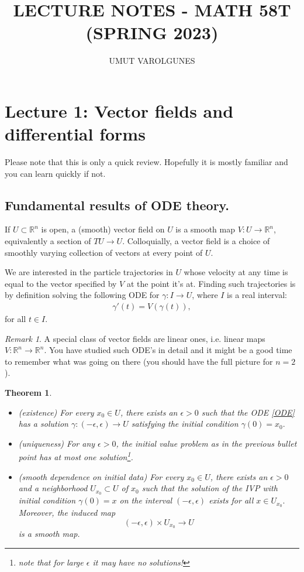 \documentclass[12pt]{amsart}
\title{LECTURE NOTES - MATH 58T (SPRING 2023)}
\author{UMUT VAROLGUNES}
\newtheorem{theorem}{Theorem}
\theoremstyle{remark}
\newtheorem{remark}{Remark}
\begin{document}
\maketitle
{\small\tableofcontents}
\newpage


\section{Lecture 1: Vector fields and differential forms}
Please note that this is only a quick review. Hopefully it is mostly familiar and you can learn quickly if not. 

\subsection{Fundamental results of ODE theory.}

If $U\subset \mathbb{R}^n$ is open, a (smooth) vector field on $U$ is a smooth map $V:U\to \mathbb{R}^n$, equivalently a section of $TU\to U$. Colloquially, a vector field is a choice of smoothly varying collection of vectors at every point of $U$. 

We are interested in the particle trajectories in $U$ whose velocity at any time is equal to the vector specified by $V$ at the point it's at. Finding such trajectories is by definition solving the following ODE for $\gamma:I\to U$, where $I$ is a real interval: \begin{align}\label{ODE} \gamma'(t)=V(\gamma(t)),
\end{align}for all $t\in I$.
\begin{remark}
A special class of vector fields are linear ones, i.e. linear maps $V: \mathbb{R}^n\to \mathbb{R}^n$. You have studied such ODE's in detail and it might be a good time to remember what was going on there (you should have the full picture for $n=2$).
\end{remark}

 \begin{theorem}
\begin{itemize}
\item (existence) For every $x_0\in U$, there exists an $\epsilon>0$ such that the ODE \eqref{ODE} has a solution $\gamma: (-\epsilon,\epsilon)\to U$ satisfying the initial condition $\gamma(0)=x_0.$
\item (uniqueness) For any  $\epsilon>0$, the initial value problem as in the previous bullet point has at most one solution\footnote{note that for large $\epsilon$ it may have no solutions!}.
\item (smooth dependence on initial data) For every $x_0\in U$, there exists an $\epsilon>0$ and a neighborhood $U_{x_0}\subset U$ of $x_0$ such that the solution of the IVP with initial condition $\gamma(0)=x$ on the interval $(-\epsilon,\epsilon)$ exists for all $x\in U_{x_0}.$ Moreover, the induced map $$(-\epsilon,\epsilon)\times U_{x_0}\to U$$ is a smooth map. 
\end{itemize}
\end{theorem}
\end{document}
